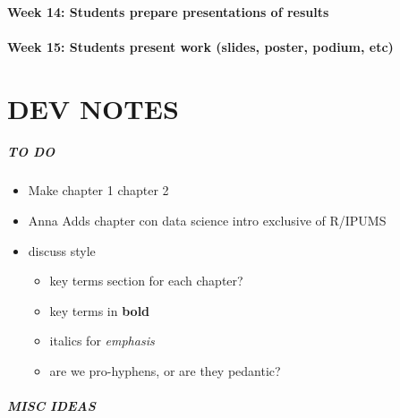 \documentclass[
]{book}
\providecommand{\tightlist}{%
  \setlength{\itemsep}{0pt}\setlength{\parskip}{0pt}}
\begin{document}
\hypertarget{week-14-students-prepare-presentations-of-results}{%
\subsubsection*{Week 14: Students prepare presentations of results}\label{week-14-students-prepare-presentations-of-results}}

\hypertarget{week-15-students-present-work-slides-poster-podium-etc}{%
\subsubsection*{Week 15: Students present work (slides, poster, podium, etc)}\label{week-15-students-present-work-slides-poster-podium-etc}}

\hypertarget{dev-notes}{%
\chapter*{DEV NOTES}\label{dev-notes}}

\hypertarget{to-do}{%
\paragraph*{TO DO}\label{to-do}}

\begin{itemize}
\item
  Make chapter 1 chapter 2
\item
  Anna Adds chapter con data science intro exclusive of R/IPUMS
\item
  discuss style

  \begin{itemize}
  \tightlist
  \item
    key terms section for each chapter?
  \item
    key terms in \textbf{bold}
  \item
    italics for \emph{emphasis}
  \item
    are we pro-hyphens, or are they pedantic?
  \end{itemize}
\end{itemize}

\hypertarget{misc-ideas}{%
\paragraph*{MISC IDEAS}\label{misc-ideas}}
\end{document}
